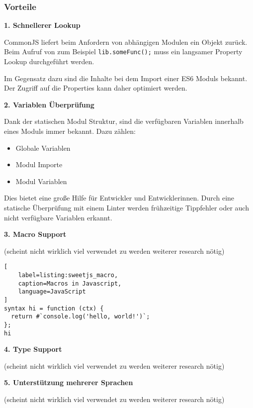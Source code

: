 \subsubsection{Vorteile}

\textbf{1. Schnellerer Lookup}

CommonJS liefert beim Anfordern von abhängigen Modulen ein Objekt zurück. Beim Aufruf von zum Beispiel \lstinline{lib.someFunc();} muss ein langsamer Property Lookup durchgeführt werden.

Im Gegensatz dazu sind die Inhalte bei dem Import einer ES6 Moduls bekannt. Der Zugriff auf die Properties kann daher optimiert werden. \autocite{AxelRauschmayer}

\bigskip

\textbf{2. Variablen Überprüfung}

Dank der statischen Modul Struktur, sind die verfügbaren Variablen innerhalb eines Moduls immer bekannt. Dazu zählen:
\begin{itemize}
\item Globale Variablen
\item Modul Importe
\item Modul Variablen
\end{itemize}
Dies bietet eine große Hilfe für Entwickler und Entwicklerinnen. Durch eine statische Überprüfung mit einem Linter werden frühzeitige Tippfehler oder auch nicht verfügbare Variablen erkannt.\autocite{AxelRauschmayer}

\bigskip

\textbf{3. Macro Support}

(scheint nicht wirklich viel verwendet zu werden weiterer research nötig)

\begin{lstlisting}[
    label=listing:sweetjs_macro,
    caption=Macros in Javascript,
	language=JavaScript
]
syntax hi = function (ctx) {
  return #`console.log('hello, world!')`;
};
hi
\end{lstlisting}



\bigskip

\textbf{4. Type Support}

(scheint nicht wirklich viel verwendet zu werden weiterer research nötig)

\bigskip

\textbf{5. Unterstützung mehrerer Sprachen}

(scheint nicht wirklich viel verwendet zu werden weiterer research nötig)

